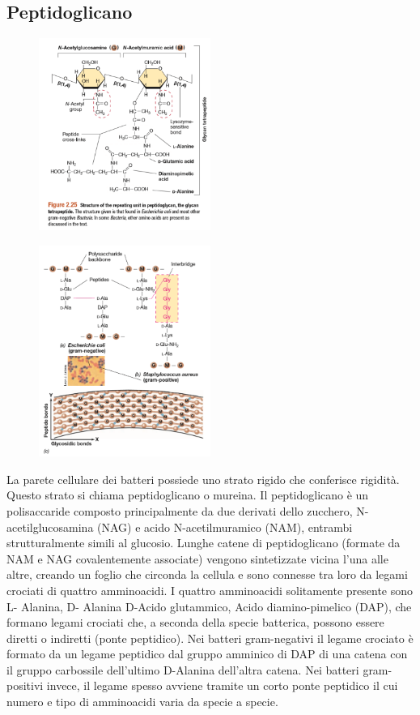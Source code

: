 \subsection{Peptidoglicano}
\begin{multicols}{2}
\begin{figure}[H]
	\includegraphics[width=0.5\textwidth]{Pictures/Peptidoglicano.png}
\end{figure}    
\columnbreak
\begin{figure}[H]
	\includegraphics[width=0.5\textwidth]{Pictures/Peptidoglicano2.png}
\end{figure}       
\end{multicols}
La parete cellulare dei batteri possiede uno strato rigido che conferisce rigidità. Questo strato si chiama peptidoglicano o mureina. Il peptidoglicano è un 
polisaccaride composto principalmente da due derivati dello zucchero, N-acetilglucosamina (NAG) e acido N-acetilmuramico (NAM), entrambi strutturalmente 
simili al glucosio. Lunghe catene di peptidoglicano (formate da NAM e NAG covalentemente associate) vengono sintetizzate vicina l’una alle altre, creando un 
foglio che circonda la cellula e sono connesse tra loro da legami crociati di quattro amminoacidi. I quattro amminoacidi solitamente presente sono L-
Alanina, D- Alanina D-Acido glutammico, Acido diamino-pimelico (DAP), che formano legami crociati che, a seconda della specie batterica, possono essere 
diretti o indiretti (ponte peptidico). Nei batteri gram-negativi il legame crociato è formato da un legame peptidico dal gruppo amminico di DAP di una 
catena con il gruppo carbossile dell’ultimo D-Alanina dell’altra catena. Nei batteri gram-positivi invece, il legame spesso avviene tramite un corto ponte 
peptidico il cui numero e tipo di amminoacidi varia da specie a specie. 
